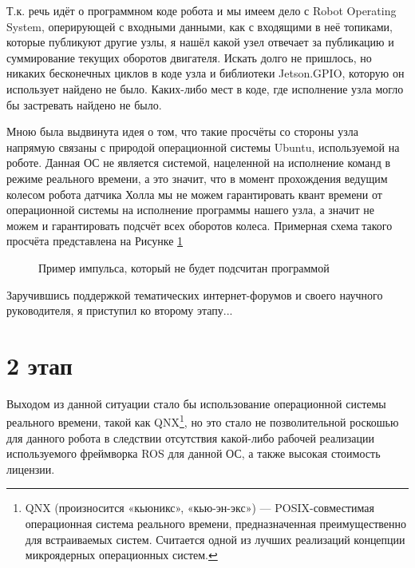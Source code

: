 \documentclass[12pt,a4paper]{scrartcl}
\begin{document}
			Т.к. речь идёт о программном коде робота и мы имеем дело с Robot Operating System, оперирующей с входными данными, как с входящими в неё топиками, которые публикуют другие узлы, я нашёл какой узел отвечает за публикацию и суммирование текущих оборотов двигателя. Искать долго не пришлось, но никаких бесконечных циклов в коде узла и библиотеки Jetson.GPIO, которую он использует найдено не было. Каких-либо мест в коде, где исполнение узла могло бы застревать найдено не было. 
			
			Мною была выдвинута идея о том, что такие просчёты со стороны узла напрямую связаны с природой операционной системы Ubuntu, используемой на роботе. Данная ОС не является системой, нацеленной на исполнение команд в режиме реального времени, а это значит, что в момент прохождения ведущим колесом робота датчика Холла мы не можем гарантировать квант времени от операционной системы на исполнение программы нашего узла, а значит не можем и гарантировать подсчёт всех оборотов колеса. Примерная схема такого просчёта представлена на Рисунке \ref{fig:Miscount}
			
			\begin{figure}[h]
				\caption{Пример импульса, который не будет подсчитан программой}
				\label{fig:Miscount}
			\end{figure}
			
			Заручившись поддержкой тематических интернет-форумов и своего научного руководителя, я приступил ко второму этапу...
			
		\section*{2 этап}
			Выходом из данной ситуации стало бы использование операционной системы реального времени, такой как QNX\footnote{QNX (произносится «кьюникс», «кью-эн-экс») — POSIX-совместимая операционная система реального времени, предназначенная преимущественно для встраиваемых систем. Считается одной из лучших реализаций концепции микроядерных операционных систем.}, но это стало не позволительной роскошью для данного робота в следствии отсутствия какой-либо рабочей реализации используемого фреймворка ROS для данной ОС, а также высокая стоимость лицензии.
			
\end{document}
